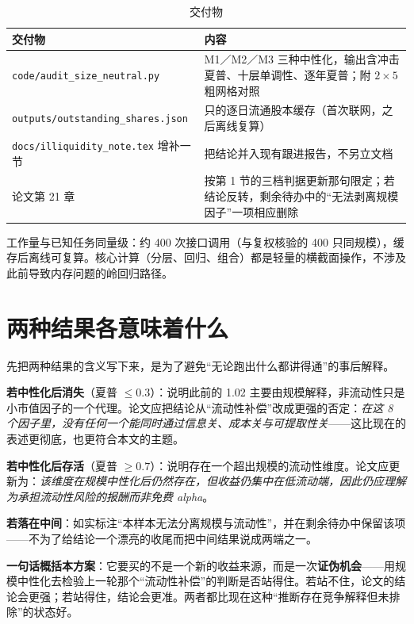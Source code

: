 \documentclass[11pt,a4paper]{ctexart}
\begin{document}
\begin{table}[htbp]
\centering
\caption{交付物}
\label{tab:deliverables}
\begin{tabular}{@{}>{\raggedright\arraybackslash}p{5.2cm}>{\raggedright\arraybackslash}p{9.2cm}@{}}
\toprule
交付物 & 内容 \\
\midrule
\texttt{code/audit\_size\_neutral.py} & M1／M2／M3 三种中性化，输出含冲击夏普、十层单调性、逐年夏普；附 $2\times5$ 粗网格对照 \\
\texttt{outputs/outstanding\_shares.json} & 400 只的逐日流通股本缓存（首次联网，之后离线复算） \\
\texttt{docs/illiquidity\_note.tex} 增补一节 & 把结论并入现有跟进报告，不另立文档 \\
论文第 21 章 & 按第 1 节的三档判据更新那句限定；若结论反转，剩余待办中的“无法剥离规模因子”一项相应删除 \\
\bottomrule
\end{tabular}
\end{table}

工作量与已知任务同量级：约 400 次接口调用（与复权核验的 400 只同规模），缓存后离线可复算。核心计算（分层、回归、组合）都是轻量的横截面操作，不涉及此前导致内存问题的岭回归路径。

\section{两种结果各意味着什么}

先把两种结果的含义写下来，是为了避免“无论跑出什么都讲得通”的事后解释。

\textbf{若中性化后消失}（夏普 $\leq 0.3$）：说明此前的 1.02 主要由规模解释，非流动性只是小市值因子的一个代理。论文应把结论从“流动性补偿”改成更强的否定：\emph{在这 8 个因子里，没有任何一个能同时通过信息关、成本关与可提取性关}——这比现在的表述更彻底，也更符合本文的主题。

\textbf{若中性化后存活}（夏普 $\geq 0.7$）：说明存在一个超出规模的流动性维度。论文应更新为：\emph{该维度在规模中性化后仍然存在，但收益仍集中在低流动端，因此仍应理解为承担流动性风险的报酬而非免费 alpha}。

\textbf{若落在中间}：如实标注“本样本无法分离规模与流动性”，并在剩余待办中保留该项——不为了给结论一个漂亮的收尾而把中间结果说成两端之一。

\medskip

\noindent\textbf{一句话概括本方案}：它要买的不是一个新的收益来源，而是一次\textbf{证伪机会}——用规模中性化去检验上一轮那个“流动性补偿”的判断是否站得住。若站不住，论文的结论会更强；若站得住，结论会更准。两者都比现在这种“推断存在竞争解释但未排除”的状态好。
\end{document}
